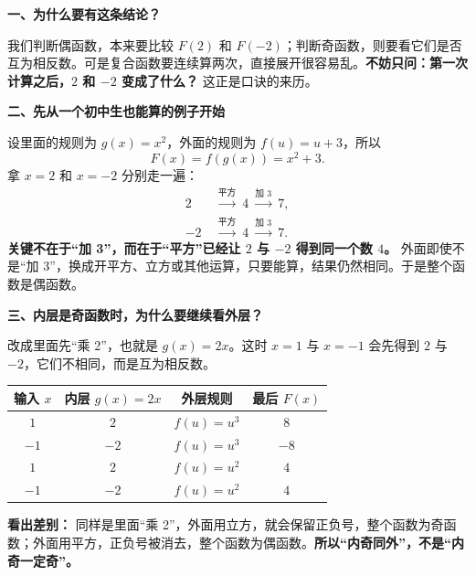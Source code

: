 \clearpage
\begin{explanationbox}
\textbf{\textcolor{CExplanation}{一、为什么要有这条结论？}}


我们判断偶函数，本来要比较 $F(2)$ 和 $F(-2)$；判断奇函数，则要看它们是否互为相反数。可是复合函数要连续算两次，直接展开很容易乱。\textbf{不妨只问：第一次计算之后，$2$ 和 $-2$ 变成了什么？} 这正是口诀的来历。

\medskip

\end{explanationbox}
\clearpage
\begin{explanationbox}
\textbf{\textcolor{CExplanation}{二、先从一个初中生也能算的例子开始}}


设里面的规则为 $g(x)=x^2$，外面的规则为 $f(u)=u+3$，所以
\[
F(x)=f(g(x))=x^2+3.
\]
拿 $x=2$ 和 $x=-2$ 分别走一遍：
\[
\begin{aligned}
\boxed{2}&\ \xrightarrow{\text{平方}}\ \boxed{4}\ \xrightarrow{\text{加 }3}\ \boxed{7},\\[0.3em]
\boxed{-2}&\ \xrightarrow{\text{平方}}\ \boxed{4}\ \xrightarrow{\text{加 }3}\ \boxed{7}.
\end{aligned}
\]
\textbf{关键不在于“加 3”，而在于“平方”已经让 $2$ 与 $-2$ 得到同一个数 $4$。} 外面即使不是“加 3”，换成开平方、立方或其他运算，只要能算，结果仍然相同。于是整个函数是偶函数。

\medskip

\end{explanationbox}
\clearpage
\begin{explanationbox}
\textbf{\textcolor{CExplanation}{三、内层是奇函数时，为什么要继续看外层？}}


改成里面先“乘 2”，也就是 $g(x)=2x$。这时 $x=1$ 与 $x=-1$ 会先得到 $2$ 与 $-2$，它们不相同，而是互为相反数。

\begin{center}
\renewcommand{\arraystretch}{1.35}
\begin{tabular}{c|c|c|c}
输入 $x$ & 内层 $g(x)=2x$ & 外层规则 & 最后 $F(x)$\\ \hline
$1$ & $2$ & $f(u)=u^3$ & $8$\\
$-1$ & $-2$ & $f(u)=u^3$ & $-8$\\ \hline
$1$ & $2$ & $f(u)=u^2$ & $4$\\
$-1$ & $-2$ & $f(u)=u^2$ & $4$
\end{tabular}
\end{center}
\textbf{看出差别：} 同样是里面“乘 2”，外面用立方，就会保留正负号，整个函数为奇函数；外面用平方，正负号被消去，整个函数为偶函数。\textbf{所以“内奇同外”，不是“内奇一定奇”。}

\medskip

\end{explanationbox}
